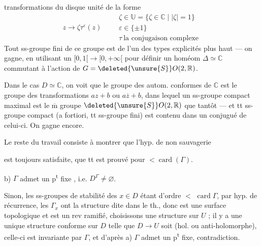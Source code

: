 

transformations du disque unité de la forme
\[
z\longrightarrow\zeta\tau^\varepsilon(z)\qquad
\begin{gathered}
\zeta\in\mathbb U=\{\zeta\in\mathbb C\mid |\zeta|=1\}\\
\varepsilon\in\{\pm1\}\\
\tau\ \text{la conjugaison complexe}
\end{gathered}
\]
Tout ss-groupe fini de ce groupe est de l'un des types explicités plus haut --- on gagne, en utilisant un  $[0,1[\longrightarrow[0,+\infty[$ pour définir un homéom  $\Delta\simeq\mathbb C$ commutant à l'action de $G=\deleted{\unsure{S}}O(2,\mathbb R)$.

Dans le cas $D\simeq\mathbb C$, on voit que  le groupe des autom. conformes de $\mathbb C$ est le groupe des transformations $az+b$ ou $a\overline z+b$, dans lequel un ss-groupe compact maximal est le $\overline{\mathrm m}$ groupe $\deleted{\unsure{S}}O(2,\mathbb R)$ que tantôt --- et tt ss-groupe compact (a fortiori, tt ss-groupe fini) est contenu dans un conjugué de celui-ci. On gagne encore.

Le reste du travail consiste  à  montrer que l'hyp. de non sauvagerie



est toujours satisfaite,    que tt est prouvé pour   $<\operatorname{card}(\Gamma)$. 

 b) $\Gamma$ admet un p\textsuperscript{t} fixe , i.e. $D^\Gamma\ne\varnothing$.

Sinon, les ss-groupes de stabilité  des $x\in D$ étant d'ordre $<$  $\operatorname{card}\Gamma$, par hyp. de récurrence, les $\Gamma_x$ ont la structure dite dans le th., donc  est une surface topologique et  est un rev ramifié, choisissons une structure   sur $U$ ; il y a une unique structure conforme sur $D$ telle que $D\longrightarrow U$ soit   (hol. ou anti-holomorphe), celle-ci est invariante par $\Gamma$, et d'après a) $\Gamma$ admet un p\textsuperscript{t} fixe, contradiction.

